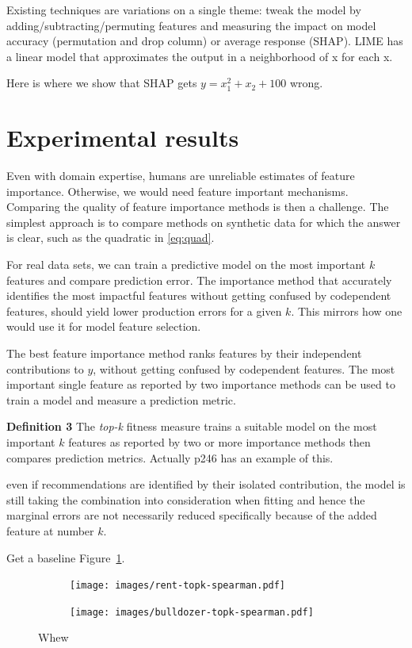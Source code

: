 \documentclass[12pt]{article}
\newcommand{\figref}[1]{Figure~\ref{#1}}
\begin{document}
Existing techniques are variations on a single theme: tweak the model by adding/subtracting/permuting features and measuring the impact on model accuracy (permutation and drop column) or average response (SHAP). LIME has a linear model that approximates the output in a neighborhood of x for each x.

Here is where we show that SHAP gets $y = x_1^2 + x_2 + 100$ wrong.

\section{Experimental results}\label{sec:experiments}

Even with domain expertise, humans are unreliable estimates of feature importance. Otherwise, we would need feature important mechanisms. Comparing the quality of feature importance methods is then a challenge. The simplest approach is to compare methods on synthetic data for which the answer is clear, such as the quadratic in \ref{eq:quad}.

For real data sets, we can train a predictive model on the most important $k$ features and compare prediction error. The importance method that accurately identifies the most impactful features without getting confused by codependent features, should yield lower production errors for a given $k$.   This mirrors how one would use it for model feature selection.
 
The best feature importance method ranks features by their independent contributions to $y$, without getting confused by codependent features. The most important single feature as reported by two importance methods can be used to train a model and measure a prediction metric.
 
{\bf Definition 3} The {\em top-k} fitness measure trains a suitable model on the  most important $k$ features as reported by two or more importance methods then compares prediction metrics. Actually p246 \cite{liu-fs} has an example of this.

even if recommendations are identified by their isolated contribution, the model is still taking the combination into consideration when fitting and hence the marginal errors are not necessarily reduced specifically because of the added feature at number $k$.

Get a baseline \figref{fig:baseline}.

\begin{figure}[b]
\centering
\begin{subfigure}{.5\textwidth}
    \centering
\texttt{[image: images/rent-topk-spearman.pdf]}
\vspace{-2mm}\vspace{3mm}
\end{subfigure}%
\begin{subfigure}{.5\textwidth}
    \centering
\texttt{[image: images/bulldozer-topk-spearman.pdf]}
\vspace{-2mm}\vspace{3mm}
\end{subfigure}
\caption{Whew}
\label{fig:baseline}
\end{figure}
\end{document}
